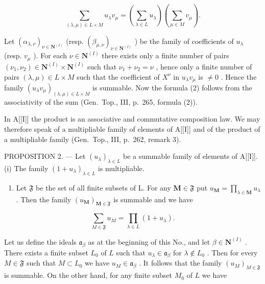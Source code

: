 \[
\sum_ {(\lambda , \mu) \in L \times M} u _ {\lambda} v _ {\mu} = \left(\sum_ {\lambda \in L} u _ {\lambda}\right) \left(\sum_ {\mu \in M} v _ {\mu}\right).\tag{2}
\]

Let \((\alpha_{\lambda, \nu})_{\nu \in \mathbf{N}^{(I)}}\) (resp. \((\beta_{\mu, \nu})_{\nu \in \mathbf{N}^{(I)}}\) ) be the family of coefficients of \(u_{\lambda}\) (resp. \(v_{\mu}\) ). For each \(\nu \in \mathbf{N}^{(I)}\) there exists only a finite number of pairs \((\nu_1, \nu_2) \in \mathbf{N}^{(I)} \times \mathbf{N}^{(I)}\) such that \(\nu_1 + \nu_2 = \nu\) , hence only a finite number of pairs \((\lambda, \mu) \in L \times M\) such that the coefficient of \(X^{\nu}\) in \(u_{\lambda}v_{\mu}\) is \(\neq 0\) . Hence the family \((u_{\lambda}v_{\mu})_{(\lambda, \mu) \in L \times M}\) is summable. Now the formula (2) follows from the associativity of the sum (Gen.~Top., III, p.~265, formula (2)).

In A{[}{[}I{]}{]} the product is an associative and commutative composition law. We may therefore speak of a multipliable family of elements of A{[}{[}I{]}{]} and of the product of a multipliable family (Gen.~Top., III, p.~262, remark 3).

PROPOSITION 2. --- Let \((u_{\lambda})_{\lambda \in L}\) be a summable family of elements of A{[}{[}I{]}{]}. (i) The family \((1 + u_{\lambda})_{\lambda \in L}\) is multipliable.

\begin{enumerate}
\def\labelenumi{(\roman{enumi})}
\setcounter{enumi}{1}
\tightlist
\item
  Let \(\mathfrak{F}\) be the set of all finite subsets of L. For any \(\mathbf{M} \in \mathfrak{F}\) put \(u_{\mathbf{M}} = \prod_{\lambda \in \mathbf{M}} u_{\lambda}\) . Then the family \((u_{\mathbf{M}})_{\mathbf{M} \in \mathfrak{F}}\) is summable and we have
\end{enumerate}

\[
\sum_ {M \in \mathfrak {F}} u _ {M} = \prod_ {\lambda \in L} (1 + u _ {\lambda}).
\]

Let us define the ideals \(\mathfrak{a}_{\beta}\) as at the beginning of this No., and let \(\beta \in \mathbf{N}^{(I)}\) . There exists a finite subset \(L_0\) of \(L\) such that \(u_{\lambda} \in \mathfrak{a}_{\beta}\) for \(\lambda \notin L_0\) . Then for every \(M \in \mathfrak{F}\) such that \(M \subset L_0\) we have \(u_M \in \mathfrak{a}_{\beta}\) . It follows that the family \((u_M)_{M \in \mathfrak{F}}\) is summable. On the other hand, for any finite subset \(M_0\) of \(L\) we have


